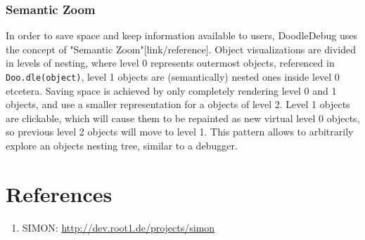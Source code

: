 \documentclass{report}
\begin{document}
\subsection*{Semantic Zoom}
In order to save space and keep information available to users, DoodleDebug uses the concept of "Semantic Zoom"[link/reference]. Object visualizations are divided in levels of nesting, where level 0 represents outermost objects, referenced in \verb-Doo.dle(object)-, level 1 objects are (semantically) nested ones inside level 0 etcetera. Saving space is achieved by only completely rendering level 0 and 1 objects, and use a smaller representation for a objects of level 2. Level 1 objects are clickable, which will cause them to be repainted as new virtual level 0 objects, so previous level 2 objects will move to level 1. This pattern allows to arbitrarily explore an objects nesting tree, similar to a debugger.

\chapter*{References}
\begin{enumerate}
\item
SIMON: \url{http://dev.root1.de/projects/simon}
\end{enumerate}
\end{document}
